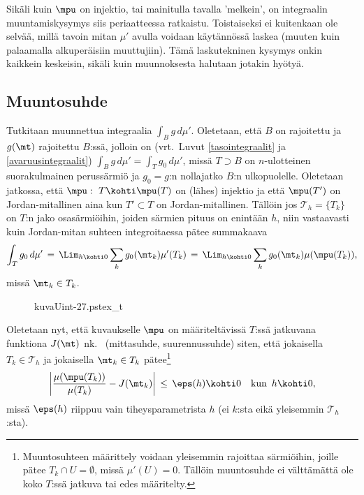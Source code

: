 Sikäli kuin $\mpu$ on injektio, tai mainitulla tavalla 'melkein', on integraalin
muuntamiskysymys siis periaatteessa ratkaistu. Toistaiseksi ei kuitenkaan ole selvää,
millä tavoin mitan $\mu'$ avulla voidaan käytännössä laskea (muuten kuin palaamalla 
alkuperäisiin muuttujiin). Tämä laskutekninen kysymys onkin kaikkein keskeisin, sikäli 
kuin muunnoksesta halutaan jotakin hyötyä.

\subsection*{Muuntosuhde}

Tutkitaan muunnettua integraalia $\int_B g\,d\mu'$. Oletetaan, että $B$ on rajoitettu ja
$g(\mt)$ rajoitettu $B$:ssä, jolloin on
(vrt.\ Luvut \ref{tasointegraalit} ja \ref{avaruusintegraalit})
$\int_B g\,d\mu'=\int_T g_0\,d\mu'$, missä $T \supset B$ on $n$-ulotteinen suorakulmainen
perussärmiö ja $g_0=g$:n nollajatko $B$:n ulkopuolelle. Oletetaan jatkossa, että
$\mpu:\ T \kohti \mpu(T)$ on (lähes) injektio ja että $\mpu(T')$ on Jordan-mitallinen aina
kun $T' \subset T$ on Jordan-mitallinen. Tällöin jos $\mathcal{T}_h=\{T_k\}\,$ on $T$:n jako
osasärmiöihin, joiden särmien pituus on enintään $h$, niin vastaavasti kuin Jordan-mitan suhteen
integroitaessa pätee summakaava
\[
\int_T g_0\,d\mu' \,=\, \Lim_{h \kohti 0} \sum_k g_0(\mt_k)\mu'(T_k)
                  \,=\, \Lim_{h \kohti 0} \sum_k g_0(\mt_k)\mu(\mpu(T_k)),
\]
missä $\mt_k \in T_k$.
\begin{figure}[H]
\begin{center}
{kuvaUint-27.pstex_t}
\end{center}
\end{figure}
Oletetaan nyt, että kuvaukselle $\mpu$ on määriteltävissä $T$:ssä jatkuvana funktiona
$J(\mt)$ nk.\  (mittasuhde, suurennussuhde) siten, että jokaisella
$T_k\in\mathcal{T}_h$ ja jokaisella $\mt_k \in T_k$ pätee\footnote[2]{Muuntosuhteen
määrittely voidaan yleisemmin rajoittaa särmiöihin, joille pätee $T_k \cap U=\emptyset$,
missä $\mu'(U)=0$. Tällöin muuntosuhde ei välttämättä ole koko $T$:ssä jatkuva tai edes
määritelty.}
\[
\left|\frac{\mu(\mpu(T_k))}{\mu(T_k)}-J(\mt_k)\right| \,\le\, \eps(h) \kohti 0 \quad 
                                                             \text{kun}\,\ h \kohti 0,
\]
missä $\eps(h)$ riippuu vain tiheysparametrista $h$ (ei $k$:sta eikä yleisemmin
$\mathcal{T}_h$:sta).

